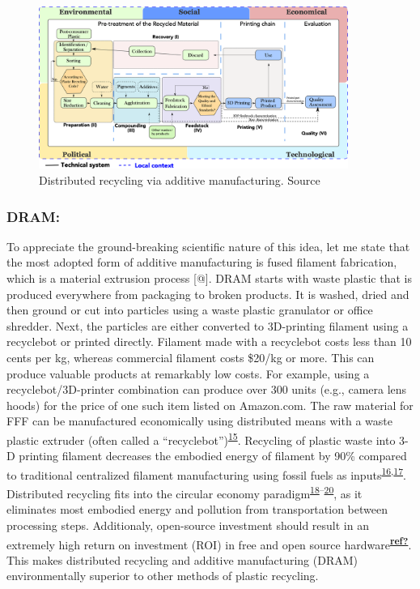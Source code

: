 \documentclass[
  11pt,
  a4paperpaper,
  onecolumn]{article}
\begin{document}
\begin{figure}

{\centering \includegraphics[width=0.9\textwidth,height=\textheight]{Figures/SDRAM-00.png}

}

\caption{\label{fig-DRAM}Distributed recycling via additive
manufacturing. Source}

\end{figure}

\hypertarget{dram}{%
\subsubsection{DRAM:}\label{dram}}

To appreciate the ground-breaking scientific nature of this idea, let me
state that the most adopted form of additive manufacturing is fused
filament fabrication, which is a material extrusion process {[}@{]}.
DRAM starts with waste plastic that is produced everywhere from
packaging to broken products. It is washed, dried and then ground or cut
into particles using a waste plastic granulator or office shredder.
Next, the particles are either converted to 3D-printing filament using a
recyclebot or printed directly. Filament made with a recyclebot costs
less than 10 cents per kg, whereas commercial filament costs \$20/kg or
more. This can produce valuable products at remarkably low costs. For
example, using a recyclebot/3D-printer combination can produce over 300
units (e.g., camera lens hoods) for the price of one such item listed on
Amazon.com. The raw material for FFF can be manufactured economically
using distributed means with a waste plastic extruder (often called a
``recyclebot'')\textsuperscript{\protect\hyperlink{ref-Baechler2013}{15}}.
Recycling of plastic waste into 3-D printing filament decreases the
embodied energy of filament by 90\% compared to traditional centralized
filament manufacturing using fossil fuels as
inputs\textsuperscript{\protect\hyperlink{ref-Kreiger2013}{16},\protect\hyperlink{ref-Zhong2017}{17}}.
Distributed recycling fits into the circular economy
paradigm\textsuperscript{\protect\hyperlink{ref-Zhong2018}{18}--\protect\hyperlink{ref-Despeisse2016}{20}},
as it eliminates most embodied energy and pollution from transportation
between processing steps. Additionaly, open-source investment should
result in an extremely high return on investment (ROI) in free and open
source
hardware\textsuperscript{\protect\hyperlink{ref-ref}{\textbf{ref?}}}.
This makes distributed recycling and additive manufacturing (DRAM)
environmentally superior to other methods of plastic recycling.
\end{document}
